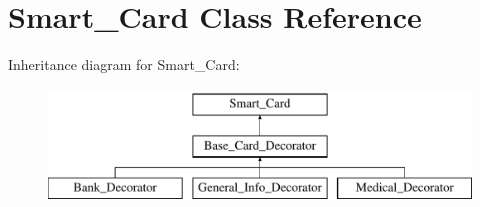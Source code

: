 \hypertarget{classSmart__Card}{}\section{Smart\+\_\+\+Card Class Reference}
\label{classSmart__Card}
Inheritance diagram for Smart\+\_\+\+Card\+:\begin{figure}[H]
\begin{center}
\leavevmode
\includegraphics[height=3.000000cm]{classSmart__Card}
\end{center}
\end{figure}
